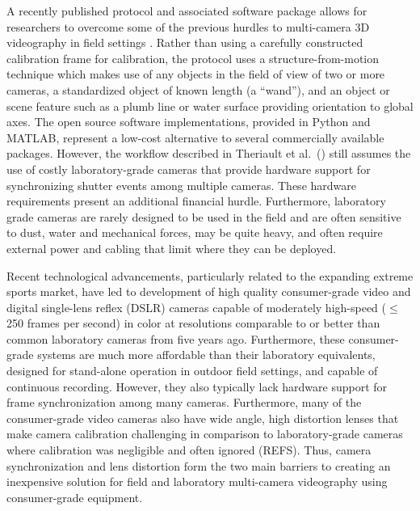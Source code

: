 \documentclass[fleqn,10pt]{wlpeerj}
\begin{document}
A recently published protocol and associated software package allows for researchers to overcome some of the previous hurdles to multi-camera 3D videography in field settings \citep{Theriault:2014}.  Rather than using a carefully constructed calibration frame for calibration, the protocol uses a structure-from-motion technique which makes use of any objects in the field of view of two or more cameras, a standardized object of known length (a “wand”), and an object or scene feature such as a plumb line or water surface providing orientation to global axes.  The open source software implementations, provided in Python and MATLAB, represent a low-cost alternative to several commercially available packages.  However, the workflow described in Theriault et al.~(\citeyear{Theriault:2014}) still assumes the use of costly laboratory-grade cameras that provide hardware support for synchronizing shutter events among multiple cameras. These hardware requirements present an additional financial hurdle. Furthermore, laboratory grade cameras are rarely designed to be used in the field and are often sensitive to dust, water and mechanical forces, may be quite heavy, and often require external power and cabling that limit where they can be deployed.

Recent technological advancements, particularly related to the expanding extreme sports market, have led to development of high quality consumer-grade video and digital single-lens reflex (DSLR) cameras capable of moderately high-speed ($\le$250 frames per second) in color at resolutions comparable to or better than common laboratory cameras from five years ago. Furthermore, these consumer-grade systems are much more affordable than their laboratory equivalents, designed for stand-alone operation in outdoor field settings, and  capable of continuous recording. However, they also typically lack hardware support for frame synchronization among many cameras.  Furthermore, many of the consumer-grade video cameras also have wide angle, high distortion lenses that make camera calibration challenging in comparison to laboratory-grade cameras where calibration was negligible and often ignored (REFS). Thus, camera synchronization and lens distortion form the two main barriers to creating an inexpensive solution for field and laboratory multi-camera videography using consumer-grade equipment.
\end{document}
